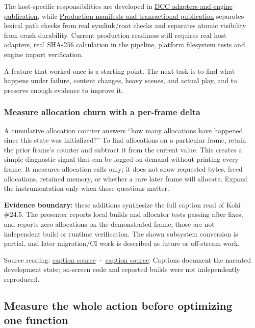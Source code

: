 The host-specific responsibilities are developed in \hyperref[appendix-03ade9e1875f]{DCC adapters and engine publication}, while \hyperref[appendix-91eaa3cbdbc3]{Production manifests and transactional publication} separates lexical path checks from real symlink/root checks and separates atomic visibility from crash durability. Current production readiness still requires real host adapters, real SHA-256 calculation in the pipeline, platform filesystem tests and engine import verification.

A feature that worked once is a starting point. The next task is to find what happens under failure, content changes, heavy scenes, and actual play, and to preserve enough evidence to improve it.

\subsubsection{Measure allocation churn with a per-frame delta}\label{06-engine-ii-ch041-measure-allocation-churn-with-a-per-frame-delta}

A cumulative allocation counter answers ``how many allocations have happened since this state was initialized?'' To find allocations on a particular frame, retain the prior frame's counter and subtract it from the current value. This creates a simple diagnostic signal that can be logged on demand without printing every frame. It measures allocation calls only; it does not show requested bytes, freed allocations, retained memory, or whether a rare later frame will allocate. Expand the instrumentation only when those questions matter.

\textbf{Evidence boundary:} these additions synthesize the full caption read of Kohi \#24.5. The presenter reports local builds and allocator tests passing after fixes, and reports zero allocations on the demonstrated frame; those are not independent build or runtime verification. The shown subsystem conversion is partial, and later migration/CI work is described as future or off-stream work.

Source reading: \href{https://www.youtube.com/watch?v=3ZFcvBjRFN0}{caption source} · \href{https://www.youtube.com/watch?v=KanKG-vd9GA}{caption source}. Captions document the narrated development state; on-screen code and reported builds were not independently reproduced.

\subsection{Measure the whole action before optimizing one function}\label{06-engine-ii-ch041-measure-the-whole-action-before-optimizing-one-function}

